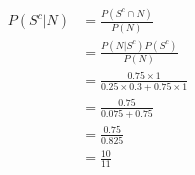 \documentclass[12pt]{article}
\begin{document}
\begin{enumerate}
\begin{enumerate}
\begin{align*}
                        P(S^c|N) &= \frac{P(S^c \cap N)}{P(N)}\\
                        &= \frac{P(N|S^c)P(S^c)}{P(N)}\\
                        &= \frac{0.75\times1}{0.25\times0.3+0.75\times1}\\
                        &= \frac{0.75}{0.075+0.75}\\
                        &= \frac{0.75}{0.825}\\
                        &= \frac{10}{11}
                    \end{align*}
                \end{enumerate} 
            \end{enumerate}
            
            
\end{document}
